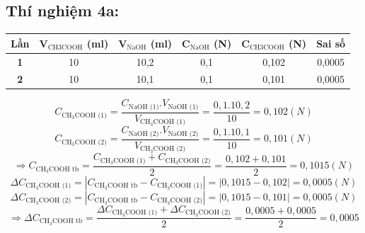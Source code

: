 \documentclass[12pt,a4paper]{report}
\begin{document}
\subsection*{Thí nghiệm 4a:}
\begin{table}[h!]
\centering
    \begin{tabular}{|c|c|c|c|c|c|}
    \hline
    \textbf{Lần} & \textbf{V$_\text{CH3COOH}$ (ml)} & \textbf{V$_\text{NaOH}$ (ml)} & \textbf{C$_\text{NaOH}$ (N)} & \textbf{C$_\text{CH3COOH}$ (N)} & \textbf{Sai số} \\ \hline
    \textbf{1}   & 10                               & 10,2                          & 0,1                          & 0,102                           & 0,0005          \\ \hline
    \textbf{2}   & 10                               & 10,1                          & 0,1                          & 0,101                           & 0,0005          \\ \hline
    \end{tabular}
    \end{table}
    \[
        C_\text{CH$_3$COOH (1)} = \frac{C_\text{NaOH (1)}.V_\text{NaOH (1)}}{V_\text{CH$_3$COOH (1)}} = \frac{0,1.10,2}{10} = 0,102 (N)
    \]
    \[
        C_\text{CH$_3$COOH (2)} = \frac{C_\text{NaOH (2)}.V_\text{NaOH (2)}}{V_\text{CH$_3$COOH (2)}} = \frac{0,1.10,1}{10} = 0,101 (N)
    \]
    \[
        \Rightarrow C_\text{CH$_3$COOH tb} = \frac{C_\text{CH$_3$COOH (1)}+C_\text{CH$_3$COOH (2)}}{2} = \frac{0,102 + 0,101}{2} = 0,1015 (N)
    \]
    \[
        \Delta C_\text{CH$_3$COOH (1)} = |C_\text{CH$_3$COOH tb} - C_\text{CH$_3$COOH (1)}| = |0,1015 - 0,102| = 0,0005 (N)
    \]
    \[
        \Delta C_\text{CH$_3$COOH (2)} = |C_\text{CH$_3$COOH tb} - C_\text{CH$_3$COOH (2)}| = |0,1015 - 0,101| = 0,0005 (N)
    \]
    \[
        \Rightarrow \Delta C_\text{CH$_3$COOH tb} = \frac{\Delta C_\text{CH$_3$COOH (1)}+\Delta C_\text{CH$_3$COOH (2)}}{2} = \frac{0,0005 +0,0005}{2} = 0,0005
    \]
\end{document}
